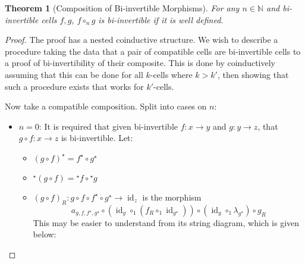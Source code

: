 \documentclass{article}
\newtheorem{theorem}{Theorem}
\theoremstyle{definition}
\theoremstyle{examplestyle}
\DeclareMathOperator{\id}{id}
\newcommand{\linv}[1]{{}^\star\!#1}
\newcommand{\rinv}[1]{#1^\star}
\begin{document}
\begin{theorem}[Composition of Bi-invertible Morphisms]
  For any \(n \in \mathbb{N}\) and bi-invertible cells \(f,g\), \(f \circ_n g\) is bi-invertible if it is well defined.
\end{theorem}
\begin{proof}
  The proof has a nested coinductive structure. We wish to describe a procedure taking the data that a pair of compatible cells are bi-invertible cells to a proof of bi-invertibility of their composite. This is done by coinductively assuming that this can be done for all \(k\)-cells where \(k>k'\), then showing that such a procedure exists that works for \(k'\)-cells.

  Now take a compatible composition. Split into cases on \(n\):
  \begin{itemize}
  \item \(n = 0\): It is required that given bi-invertible \(f : x \to y\) and \(g : y \to z\), that \(g \circ f : x \to z\) is bi-invertible. Let:
    \begin{itemize}
      \item \(\rinv {(g \circ f)} = \rinv f \circ \rinv g\)
      \item \(\linv {(g \circ f)} = \linv f \circ \linv g\)
      \item \({(g \circ f)}_R : g \circ f \circ \rinv f \circ \rinv g \to \id_z\) is the morphism
        \begin{equation*}
          a_{g,f,\rinv f,\rinv g} \circ (\id_g \circ_1 (f_R \circ_1 \id_{\rinv g})) \circ (\id_g \circ_1 \lambda_{\rinv g}) \circ g_R
        \end{equation*}
        This may be easier to understand from its string diagram, which is given below:
        \begin{center}

\end{center}
\end{itemize}
\end{itemize}
\end{proof}
\end{document}
